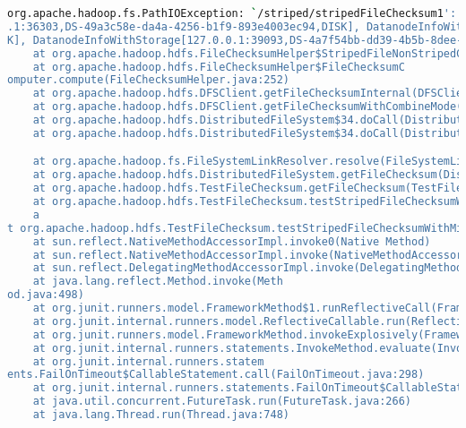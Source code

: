 \documentclass{report}%
\begin{document}
\begin{lstlisting}[language=bash]
org.apache.hadoop.fs.PathIOException: `/striped/stripedFileChecksum1': Fail to get block checksum for LocatedStripedBlock{BP-1812707539-172.17.0.3-1602771351154:blk_-9223372036854775792_1001; getBlockSize()=37748736; corrupt=false; offset=0; locs=[DatanodeInfoWithStorage[127.0.0.1:36687,DS-b00139f0-4f28-4870-8f72-b726bd339e23,DISK], DatanodeInfoWithStorage[127.0.0
.1:36303,DS-49a3c58e-da4a-4256-b1f9-893e4003ec94,DISK], DatanodeInfoWithStorage[127.0.0.1:43975,DS-ac278858-b6c8-424f-9e20-58d718dabe31,DISK], DatanodeInfoWithStorage[127.0.0.1:37507,DS-17f9d8d8-f8d3-443b-8df7-29416a2f5cb0,DISK], DatanodeInfoWithStorage[127.0.0.1:36441,DS-7e9d19b5-6220-465f-b33e-f8ed0e60fb07,DISK], DatanodeInfoWithStorage[127.0.0.1:42555,DS-ce679f5e-19fe-45b0-a0cd-8d8bec2f4735,DIS
K], DatanodeInfoWithStorage[127.0.0.1:39093,DS-4a7f54bb-dd39-4b5b-8dee-31a1b565cd7f,DISK], DatanodeInfoWithStorage[127.0.0.1:41699,DS-e1f939f3-37e7-413e-a522-934243477d81,DISK]]; indices=[1, 2, 3, 4, 5, 6, 7, 8]}
	at org.apache.hadoop.hdfs.FileChecksumHelper$StripedFileNonStripedChecksumComputer.checksumBlocks(FileChecksumHelper.java:640)
	at org.apache.hadoop.hdfs.FileChecksumHelper$FileChecksumC
omputer.compute(FileChecksumHelper.java:252)
	at org.apache.hadoop.hdfs.DFSClient.getFileChecksumInternal(DFSClient.java:1851)
	at org.apache.hadoop.hdfs.DFSClient.getFileChecksumWithCombineMode(DFSClient.java:1871)
	at org.apache.hadoop.hdfs.DistributedFileSystem$34.doCall(DistributedFileSystem.java:1902)
	at org.apache.hadoop.hdfs.DistributedFileSystem$34.doCall(DistributedFileSystem.java:1899)

	at org.apache.hadoop.fs.FileSystemLinkResolver.resolve(FileSystemLinkResolver.java:81)
	at org.apache.hadoop.hdfs.DistributedFileSystem.getFileChecksum(DistributedFileSystem.java:1916)
	at org.apache.hadoop.hdfs.TestFileChecksum.getFileChecksum(TestFileChecksum.java:584)
	at org.apache.hadoop.hdfs.TestFileChecksum.testStripedFileChecksumWithMissedDataBlocksRangeQuery(TestFileChecksum.java:295)
	a
t org.apache.hadoop.hdfs.TestFileChecksum.testStripedFileChecksumWithMissedDataBlocksRangeQuery7(TestFileChecksum.java:377)
	at sun.reflect.NativeMethodAccessorImpl.invoke0(Native Method)
	at sun.reflect.NativeMethodAccessorImpl.invoke(NativeMethodAccessorImpl.java:62)
	at sun.reflect.DelegatingMethodAccessorImpl.invoke(DelegatingMethodAccessorImpl.java:43)
	at java.lang.reflect.Method.invoke(Meth
od.java:498)
	at org.junit.runners.model.FrameworkMethod$1.runReflectiveCall(FrameworkMethod.java:50)
	at org.junit.internal.runners.model.ReflectiveCallable.run(ReflectiveCallable.java:12)
	at org.junit.runners.model.FrameworkMethod.invokeExplosively(FrameworkMethod.java:47)
	at org.junit.internal.runners.statements.InvokeMethod.evaluate(InvokeMethod.java:17)
	at org.junit.internal.runners.statem
ents.FailOnTimeout$CallableStatement.call(FailOnTimeout.java:298)
	at org.junit.internal.runners.statements.FailOnTimeout$CallableStatement.call(FailOnTimeout.java:292)
	at java.util.concurrent.FutureTask.run(FutureTask.java:266)
	at java.lang.Thread.run(Thread.java:748)
\end{lstlisting} \ \newline%
\end{document}
